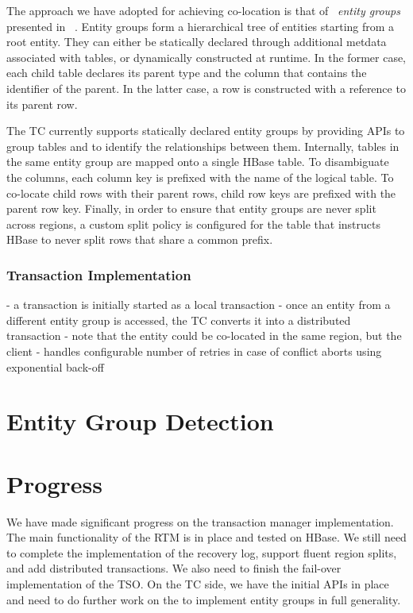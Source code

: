 \documentclass[10pt,final,journal]{IEEEtran}
\begin{document}
The approach we have adopted for achieving co-location is that of ~\emph{entity groups} presented in ~\cite{Baker:2011:8530095}. Entity groups form a hierarchical tree of entities starting from a root entity. They can either be statically declared through additional metdata associated with tables, or dynamically constructed at runtime. In the former case, each child table declares its parent type and the column that contains the identifier of the parent. In the latter case, a row is constructed with a reference to its parent row.

The TC currently supports statically declared entity groups by providing APIs to group tables and to identify the relationships between them. Internally, tables in the same entity group are mapped onto a single HBase table. To disambiguate the columns, each column key is prefixed with the name of the logical table. To co-locate child rows with their parent rows, child row keys are prefixed with the parent row key. Finally, in order to ensure that entity groups are never split across regions, a custom split policy is configured for the table that instructs HBase to never split rows that share a common prefix.

\subsubsection{Transaction Implementation}
- a transaction is initially started as a local transaction
- once an entity from a different entity group is accessed, the TC converts it into a distributed transaction
- note that the entity could be co-located in the same region, but the client 
- handles configurable number of retries in case of conflict aborts using exponential back-off


\section{Entity Group Detection}


\section{Progress}
We have made significant progress on the transaction manager implementation. The main functionality of the RTM is in place and tested on HBase. We still need to complete the implementation of the recovery log, support fluent region splits, and add distributed transactions. We also need to finish the fail-over implementation of the TSO. On the TC side, we have the initial APIs in place and need to do further work on the  to implement entity groups in full generality.
\end{document}
